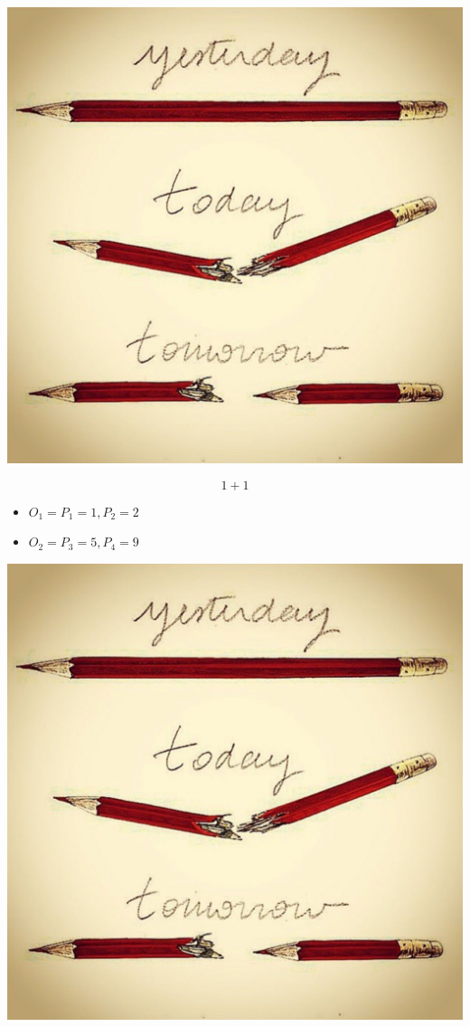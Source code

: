 \documentclass{article}
\begin{document}
\includegraphics{test-image}

\begin{equation}
  1+1
\end{equation}


\begin{itemize}
\item $O_1 = {P_1 = {1}, P_2 = {2}}$
\item $O_2 = {P_3 = {5}, P_4 = {9}}$
\end{itemize}


\includegraphics{test-image.jpg}
\end{document}
